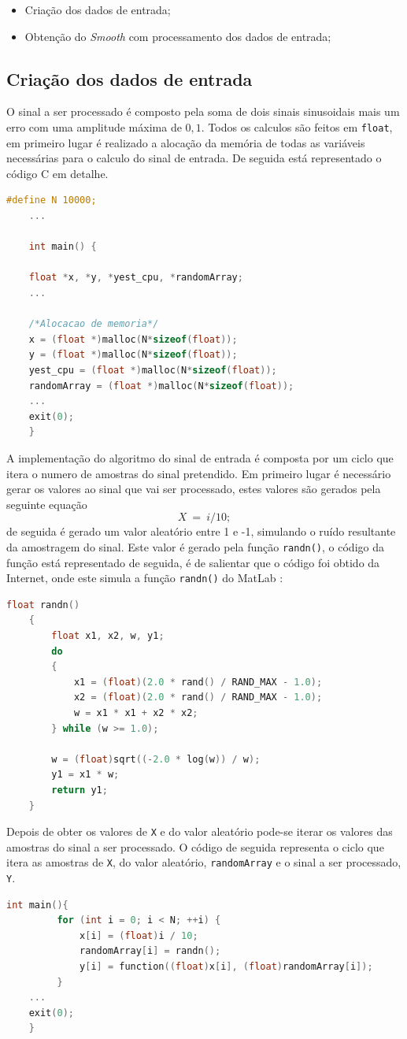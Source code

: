\documentclass[11pt]{article}
\numberwithin{equation}{section}
\begin{document}
\begin{itemize}
	\vspace{-3mm}
	\item Criação dos dados de entrada;
	\vspace{-1.5mm}
	\item  Obtenção do \textit{Smooth} com processamento dos dados de entrada;
\end{itemize}
	\subsection{Criação dos dados de entrada}
	O sinal a ser processado é composto pela soma de dois sinais sinusoidais mais um erro com uma amplitude máxima de $0,1$. 
	Todos os calculos são feitos em \texttt{float}, em primeiro lugar é realizado a alocação da memória de todas as variáveis necessárias para o calculo do sinal de entrada. De seguida está representado o código C em detalhe.
\begin{lstlisting}[language=C]
#define N 10000;
	...

	int main() {
	
	float *x, *y, *yest_cpu, *randomArray;
	...
	
	/*Alocacao de memoria*/
	x = (float *)malloc(N*sizeof(float));
	y = (float *)malloc(N*sizeof(float));
	yest_cpu = (float *)malloc(N*sizeof(float));
	randomArray = (float *)malloc(N*sizeof(float));
	...
	exit(0);
	}
\end{lstlisting}

	A implementação do algoritmo do sinal de entrada é composta por um ciclo que itera o numero de amostras do sinal pretendido. Em primeiro lugar é necessário gerar os valores ao sinal que vai ser processado, estes valores são gerados pela seguinte equação
	\vspace{-3mm}
	\begin{equation}
		X ~= ~i/10; 
	\end{equation}
	de seguida é gerado um valor aleatório entre 1 e -1, simulando o ruído resultante da
	amostragem do sinal. Este valor é gerado pela função \texttt{randn()}, o código da função está representado de seguida, é de salientar que o código foi obtido da Internet, onde este simula a função \texttt{randn()} do MatLab :
	\begin{lstlisting}[language=C]
	float randn()
	{
		float x1, x2, w, y1;
		do
		{
			x1 = (float)(2.0 * rand() / RAND_MAX - 1.0);
			x2 = (float)(2.0 * rand() / RAND_MAX - 1.0);
			w = x1 * x1 + x2 * x2;
		} while (w >= 1.0);
	
		w = (float)sqrt((-2.0 * log(w)) / w);
		y1 = x1 * w;
		return y1;
	}
	\end{lstlisting}
	 Depois de obter os valores de \texttt{X} e do valor aleatório pode-se iterar os valores das amostras do sinal a ser processado. O código de seguida representa o ciclo que itera as amostras de \texttt{X}, do valor aleatório, \texttt{randomArray} e o sinal a ser processado, \texttt{Y}.
	 \begin{lstlisting}[language=C]
	 int main(){
		 for (int i = 0; i < N; ++i) {
			 x[i] = (float)i / 10;
			 randomArray[i] = randn();
			 y[i] = function((float)x[i], (float)randomArray[i]);
		 }
	...
	exit(0);
	}
	 \end{lstlisting}
	 
\end{document}

